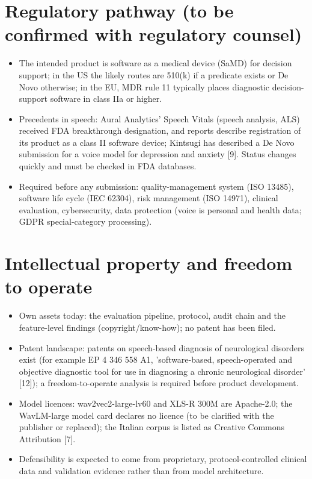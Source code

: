 \documentclass[10pt,a4paper]{article}
\begin{document}
\section{Regulatory pathway (to be confirmed with regulatory counsel)}\label{sec:regulatory}
\begin{itemize}\item The intended product is software as a medical device (SaMD) for decision support; in the US the likely routes are 510(k) if a predicate exists or De Novo otherwise; in the EU, MDR rule 11 typically places diagnostic decision-support software in class IIa or higher.
\item Precedents in speech: Aural Analytics' Speech Vitals (speech analysis, ALS) received FDA breakthrough designation, and reports describe registration of its product as a class II software device; Kintsugi has described a De Novo submission for a voice model for depression and anxiety [9]. Status changes quickly and must be checked in FDA databases.
\item Required before any submission: quality-management system (ISO 13485), software life cycle (IEC 62304), risk management (ISO 14971), clinical evaluation, cybersecurity, data protection (voice is personal and health data; GDPR special-category processing).
\end{itemize}
\section{Intellectual property and freedom to operate}\label{sec:ip}
\begin{itemize}\item Own assets today: the evaluation pipeline, protocol, audit chain and the feature-level findings (copyright/know-how); no patent has been filed.
\item Patent landscape: patents on speech-based diagnosis of neurological disorders exist (for example EP 4 346 558 A1, 'software-based, speech-operated and objective diagnostic tool for use in diagnosing a chronic neurological disorder' [12]); a freedom-to-operate analysis is required before product development.
\item Model licences: wav2vec2-large-lv60 and XLS-R 300M are Apache-2.0; the WavLM-large model card declares no licence (to be clarified with the publisher or replaced); the Italian corpus is listed as Creative Commons Attribution [7].
\item Defensibility is expected to come from proprietary, protocol-controlled clinical data and validation evidence rather than from model architecture.
\end{itemize}
\end{document}
